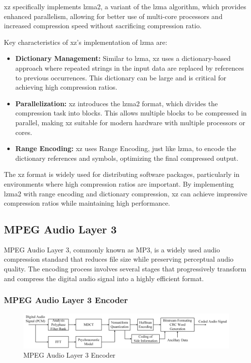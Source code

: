 \documentclass{ioereport}
\begin{document}
    xz specifically implements \gls{lzma}2, a variant of the \gls{lzma} algorithm, which provides enhanced parallelism, allowing for better use of multi-core processors and increased compression speed without sacrificing compression ratio.

    Key characteristics of xz's implementation of \gls{lzma} are:

    \begin{itemize}
        \item \textbf{Dictionary Management:} Similar to \gls{lzma}, xz uses a dictionary-based approach where repeated strings in the input data are replaced by references to previous occurrences. This dictionary can be large and is critical for achieving high compression ratios.
        \item \textbf{Parallelization:} xz introduces the \gls{lzma}2 format, which divides the compression task into blocks. This allows multiple blocks to be compressed in parallel, making xz suitable for modern hardware with multiple processors or cores.
        \item \textbf{Range Encoding:} xz uses Range Encoding, just like \gls{lzma}, to encode the dictionary references and symbols, optimizing the final compressed output.
    \end{itemize}

    The xz format is widely used for distributing software packages, particularly in environments where high compression ratios are important. By implementing \gls{lzma}2 with range encoding and dictionary compression, xz can achieve impressive compression ratios while maintaining high performance.

    \subsection{MPEG Audio Layer 3}
    MPEG Audio Layer 3, commonly known as MP3, is a widely used audio compression standard that reduces file size while preserving perceptual audio quality. The encoding process involves several stages that progressively transform and compress the digital audio signal into a highly efficient format.
    
    \subsubsection{MPEG Audio Layer 3 Encoder}
        \begin{figure}[H]
            \centering
            \includegraphics[width=0.95\linewidth]{assets/mp3_encoder.png}
            \caption{MPEG Audio Layer 3 Encoder}
            \label{fig:mp3_encoder}
        \end{figure}
\end{document}
